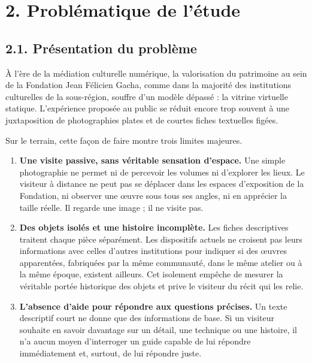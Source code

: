 \section*{2. Problématique de l'étude}

\subsection*{2.1. Présentation du problème}

À l'ère de la médiation culturelle numérique, la valorisation du patrimoine au
sein de la Fondation Jean Félicien Gacha, comme dans la majorité des
institutions culturelles de la sous-région, souffre d'un modèle dépassé : la
vitrine virtuelle statique. L'expérience proposée au public se réduit encore
trop souvent à une juxtaposition de photographies plates et de courtes fiches
textuelles figées.

Sur le terrain, cette façon de faire montre trois limites majeures.

\begin{enumerate}
  \item \textbf{Une visite passive, sans véritable sensation d'espace.} Une
        simple photographie ne permet ni de percevoir les volumes ni d'explorer
        les lieux. Le visiteur à distance ne peut pas se déplacer dans les
        espaces d'exposition de la Fondation, ni observer une œuvre sous tous
        ses angles, ni en apprécier la taille réelle. Il regarde une image ; il
        ne visite pas.

  \item \textbf{Des objets isolés et une histoire incomplète.} Les fiches
        descriptives traitent chaque pièce séparément. Les dispositifs actuels
        ne croisent pas leurs informations avec celles d'autres institutions
        pour indiquer si des œuvres apparentées, fabriquées par la même
        communauté, dans le même atelier ou à la même époque, existent
        ailleurs. Cet isolement empêche de mesurer la véritable portée
        historique des objets et prive le visiteur du récit qui les relie.

  \item \textbf{L'absence d'aide pour répondre aux questions précises.} Un texte
        descriptif court ne donne que des informations de base. Si un visiteur
        souhaite en savoir davantage sur un détail, une technique ou une
        histoire, il n'a aucun moyen d'interroger un guide capable de lui
        répondre immédiatement et, surtout, de lui répondre juste.
\end{enumerate}

